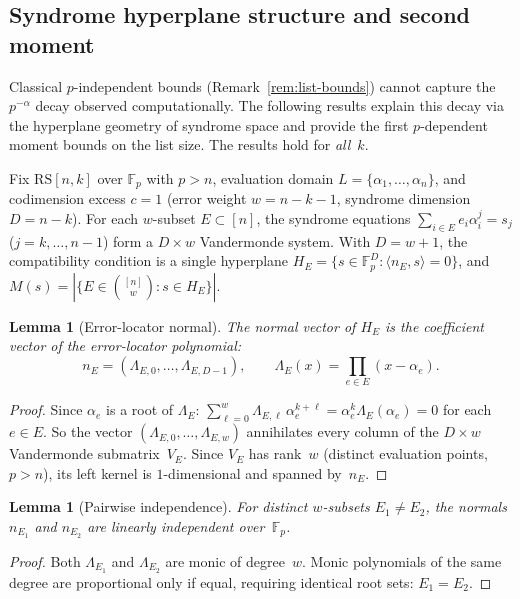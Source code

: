 \documentclass[11pt]{article}
\newtheorem{lemma}[theorem]{Lemma}
\newcommand{\FF}{\mathbb{F}}
\newcommand{\RS}{\mathrm{RS}}
\begin{document}
\subsection{Syndrome hyperplane structure and second moment}
\label{sec:poisson}

Classical $p$-independent bounds (Remark~\ref{rem:list-bounds}) cannot capture the $p^{-\alpha}$ decay observed computationally. The following results explain this decay via the hyperplane geometry of syndrome space and provide the first $p$-dependent moment bounds on the list size. The results hold for \emph{all}~$k$.

Fix $\RS[n,k]$ over $\FF_p$ with $p > n$, evaluation domain $L = \{\alpha_1, \ldots, \alpha_n\}$, and codimension excess $c = 1$ (error weight $w = n - k - 1$, syndrome dimension $D = n - k$). For each $w$-subset $E \subset [n]$, the syndrome equations $\sum_{i \in E} e_i \alpha_i^j = s_j$ ($j = k, \ldots, n{-}1$) form a $D \times w$ Vandermonde system. With $D = w + 1$, the compatibility condition is a single hyperplane $H_E = \{s \in \FF_p^D : \langle n_E, s \rangle = 0\}$, and $M(s) = |\{E \in \binom{[n]}{w} : s \in H_E\}|$.

\begin{lemma}[Error-locator normal]
\label{lem:locator-normal}
The normal vector of $H_E$ is the coefficient vector of the error-locator polynomial:
$$n_E = (\Lambda_{E,0}, \ldots, \Lambda_{E,D-1}), \qquad \Lambda_E(x) = \prod_{e \in E}(x - \alpha_e).$$
\end{lemma}

\begin{proof}
Since $\alpha_e$ is a root of $\Lambda_E$: $\sum_{\ell=0}^{w} \Lambda_{E,\ell}\, \alpha_e^{k+\ell} = \alpha_e^k \Lambda_E(\alpha_e) = 0$ for each $e \in E$. So the vector $(\Lambda_{E,0}, \ldots, \Lambda_{E,w})$ annihilates every column of the $D \times w$ Vandermonde submatrix~$V_E$. Since $V_E$ has rank~$w$ (distinct evaluation points, $p > n$), its left kernel is $1$-dimensional and spanned by~$n_E$.
\end{proof}

\begin{lemma}[Pairwise independence]
\label{lem:pairwise-indep}
For distinct $w$-subsets $E_1 \neq E_2$, the normals $n_{E_1}$ and $n_{E_2}$ are linearly independent over~$\FF_p$.
\end{lemma}

\begin{proof}
Both $\Lambda_{E_1}$ and $\Lambda_{E_2}$ are monic of degree~$w$. Monic polynomials of the same degree are proportional only if equal, requiring identical root sets: $E_1 = E_2$.
\end{proof}
\end{document}
